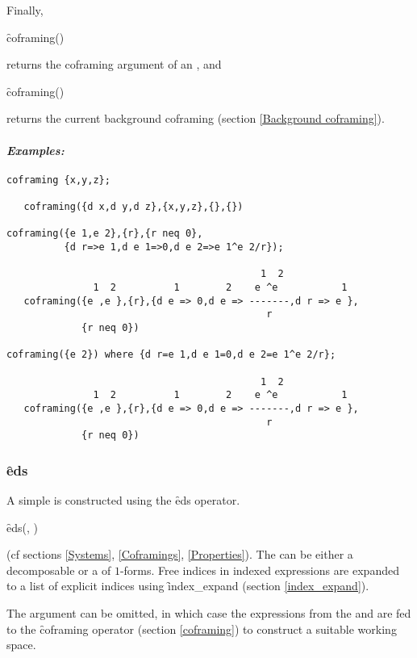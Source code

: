 Finally,
\begin{syntax}
	\f{coframing}()
\end{syntax}
returns the coframing argument of an , and
\begin{syntax}
	\f{coframing}()
\end{syntax}
returns the current background coframing (section \ref{Background
coframing}).

\paragraph{\textit{Examples:}}
\begin{verbatim}
coframing {x,y,z};

   coframing({d x,d y,d z},{x,y,z},{},{})

coframing({e 1,e 2},{r},{r neq 0},
          {d r=>e 1,d e 1=>0,d e 2=>e 1^e 2/r});

                                            1  2
               1  2          1        2    e ^e           1
   coframing({e ,e },{r},{d e => 0,d e => -------,d r => e },
                                             r
             {r neq 0})

coframing({e 2}) where {d r=e 1,d e 1=0,d e 2=e 1^e 2/r};

                                            1  2
               1  2          1        2    e ^e           1
   coframing({e ,e },{r},{d e => 0,d e => -------,d r => e },
                                             r
             {r neq 0})
\end{verbatim}

\subsubsection{\f{eds}}
\label{eds}

\hypertarget{operator:EDS}{}
A simple  is constructed using the \f{eds} operator.
\begin{syntax}
	\f{eds}(,%
	)
\end{syntax}
(cf sections \ref{Systems}, \ref{Coframings}, \ref{Properties}). The
 can be either a decomposable  or a
 of $1$-forms. Free indices in indexed expressions are expanded
to a list of explicit indices using \f{index\_expand} (section
\ref{index_expand}).

The  argument can be omitted, in which case the expressions
from the  and  are fed to the
\f{coframing} operator (section \ref{coframing}) to construct a suitable
working space.


